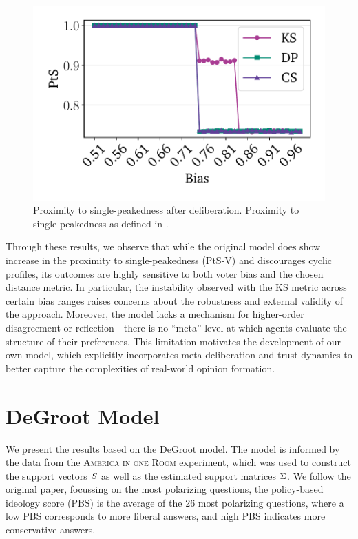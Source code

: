 \begin{figure}[htbp]
	\begin{minipage}{0.45\textwidth}
		\centering
		\vspace{-9pt}
		\includegraphics[width=\textwidth]{Figures/sp_proximity_PtS.pdf}
		\caption{Proximity to single-peakedness after deliberation. Proximity to single-peakedness as defined in .}
		\label{fig:rep_single_peaked}
	\end{minipage}
\end{figure}

Through these results, we observe that while the original model does show
increase in the proximity to single-peakedness (PtS-V) and discourages cyclic
profiles, its outcomes are highly sensitive to both voter bias and the chosen
distance metric. In particular, the instability observed with the KS metric
across certain bias ranges raises concerns about the robustness and external
validity of the approach. Moreover, the model lacks a mechanism for
higher-order disagreement or reflection—there is no ``meta'' level at which
agents evaluate the structure of their preferences. This limitation motivates
the development of our own model, which explicitly incorporates
meta-deliberation and trust dynamics to better capture the complexities of
real-world opinion formation.

\newpage
\section{DeGroot Model}\label{degroot_results}

We present the results based on the DeGroot model. The model is informed by the
data from the \textsc{America in one Room} experiment, which was used to
construct the support vectors $S$ as well as the estimated support
matrices $\Sigma$. We follow the original paper, focussing on the most
polarizing questions, the
policy-based ideology score (PBS) is the average of the 26 most polarizing
questions, where a low PBS corresponds to more liberal answers, and high PBS
indicates more conservative answers.

